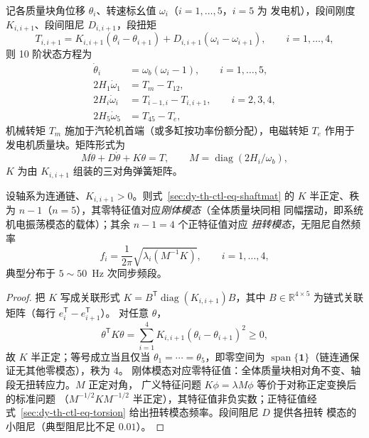 \begin{definition}[五质量块轴系方程]\label{sec:dy-th-ctl-def-shaft}
记各质量块角位移 $\theta_i$、转速标幺值 $\omega_i$（$i=1,\dots,5$，$i=5$ 为
发电机），段间刚度 $K_{i,i+1}$、段间阻尼 $D_{i,i+1}$，段扭矩
\begin{equation}
T_{i,i+1}=K_{i,i+1}(\theta_i-\theta_{i+1})+D_{i,i+1}(\omega_i-\omega_{i+1}),
\qquad i=1,\dots,4,
\label{sec:dy-th-ctl-eq-shaftseg}
\end{equation}
则 10 阶状态方程为
\begin{align}
\dot\theta_i &= \omega_b(\omega_i-1),\qquad i=1,\dots,5,\\
2H_1\dot\omega_1 &= T_m-T_{12},\\
2H_i\dot\omega_i &= T_{i-1,i}-T_{i,i+1},\qquad i=2,3,4,\\
2H_5\dot\omega_5 &= T_{45}-T_e,
\label{sec:dy-th-ctl-eq-shaft}
\end{align}
机械转矩 $T_m$ 施加于汽轮机首端（或多缸按功率份额分配），电磁转矩 $T_e$ 作用于
发电机质量块。矩阵形式为
\begin{equation}
M\ddot\theta+D\dot\theta+K\theta=T,
\qquad M=\operatorname{diag}(2H_i/\omega_b),
\label{sec:dy-th-ctl-eq-shaftmat}
\end{equation}
$K$ 为由 $K_{i,i+1}$ 组装的三对角弹簧矩阵。
\end{definition}

\begin{theorem}[轴系模态结构]\label{sec:dy-th-ctl-thm-shaft}
设轴系为连通链、$K_{i,i+1}>0$。则式~\eqref{sec:dy-th-ctl-eq-shaftmat} 的 $K$
半正定、秩为 $n-1$（$n=5$），其零特征值对应\emph{刚体模态}（全体质量块同相
同幅摆动，即系统机电振荡模态的载体）；其余 $n-1=4$ 个正特征值对应
\emph{扭转模态}，无阻尼自然频率
\begin{equation}
f_i=\frac{1}{2\pi}\sqrt{\lambda_i(M^{-1}K)},\qquad i=1,\dots,4,
\label{sec:dy-th-ctl-eq-torsion}
\end{equation}
典型分布于 $5\sim50$~Hz 次同步频段。
\end{theorem}

\begin{proof}
把 $K$ 写成关联形式 $K=B^{\mathsf T}\operatorname{diag}(K_{i,i+1})B$，其中
$B\in\mathbb R^{4\times5}$ 为链式关联矩阵（每行 $e_i^{\mathsf T}-e_{i+1}^{\mathsf T}$）。
对任意 $\theta$，
\begin{equation}
\theta^{\mathsf T}K\theta=\sum_{i=1}^{4}K_{i,i+1}(\theta_i-\theta_{i+1})^2\ge0,
\end{equation}
故 $K$ 半正定；等号成立当且仅当 $\theta_1=\cdots=\theta_5$，即零空间为
$\operatorname{span}\{\mathbf 1\}$（链连通保证无其他零模态），秩为 $4$。
刚体模态对应零特征值：全体质量块相对角不变、轴段无扭转应力。$M$ 正定对角，
广义特征问题 $K\phi=\lambda M\phi$ 等价于对称正定变换后的标准问题
（$M^{-1/2}KM^{-1/2}$ 半正定），其特征值非负实数；正特征值经
式~\eqref{sec:dy-th-ctl-eq-torsion} 给出扭转模态频率。段间阻尼 $D$ 提供各扭转
模态的小阻尼（典型阻尼比不足 $0.01$）。
\end{proof}

